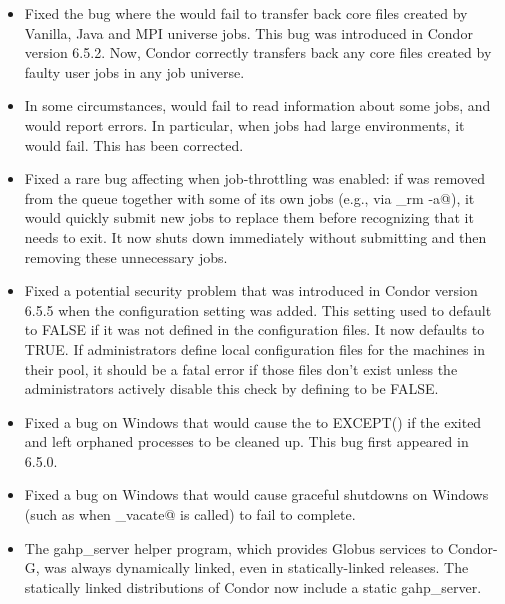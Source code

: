 \begin{itemize}
\item Fixed the bug where the  would fail to transfer
  back core files created by Vanilla, Java and MPI universe jobs.
  This bug was introduced in Condor version 6.5.2.
  Now, Condor correctly transfers back any core files created by
  faulty user jobs in any job universe.

\item In some circumstances,  would fail to read
  information about some jobs, and would report errors. In particular,
  when jobs had large environments, it would fail. This has been
  corrected.

\item Fixed a rare bug affecting  when job-throttling
      was enabled: if  was removed from the queue
      together with some of its own jobs (e.g., via \verb@condor_rm -a@),
      it would quickly submit new jobs to replace them before
      recognizing that it needs to exit.  It now shuts down
      immediately without submitting and then removing these
      unnecessary jobs.

\item Fixed a potential security problem that was introduced in Condor
  version 6.5.5 when the 
  configuration setting was added.
  This setting used to default to FALSE if it was not defined in the
  configuration files.
  It now defaults to TRUE.
  If administrators define local configuration files for the machines
  in their pool, it should be a fatal error if those files don't exist
  unless the administrators actively disable this check by defining 
   to be FALSE.

\item Fixed a bug on Windows that would cause the  to
EXCEPT() if the  exited and left orphaned processes to
be cleaned up. This bug first appeared in 6.5.0.

\item Fixed a bug on Windows that would cause graceful shutdowns on
Windows (such as when \verb@condor_vacate@  is called) to fail to
complete.

\item The gahp\_server helper program, which provides Globus services
to Condor-G, was always dynamically linked, even in statically-linked
releases.
The statically linked distributions of Condor now include a static
gahp\_server.


\end{itemize}
